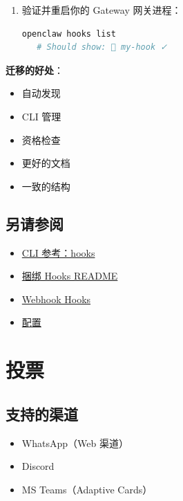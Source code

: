 \begin{enumerate}
  \item 验证并重启你的 Gateway 网关进程：
\begin{lstlisting}[language=bash]
   openclaw hooks list
   # Should show: 🎯 my-hook ✓
\end{lstlisting}

\end{enumerate}


\textbf{迁移的好处}：

\begin{itemize}
  \item 自动发现
  \item CLI 管理
  \item 资格检查
  \item 更好的文档
  \item 一致的结构
\end{itemize}


\subsection{另请参阅}


\begin{itemize}
  \item \href{/cli/hooks}{CLI 参考：hooks}
  \item \href{https://github.com/openclaw/openclaw/tree/main/src/hooks/bundled}{捆绑 Hooks README}
  \item \href{/automation/webhook}{Webhook Hooks}
  \item \href{/gateway/configuration\#hooks}{配置}
\end{itemize}



\clearpage

\section{投票}


\subsection{支持的渠道}


\begin{itemize}
  \item WhatsApp（Web 渠道）
  \item Discord
  \item MS Teams（Adaptive Cards）
\end{itemize}


